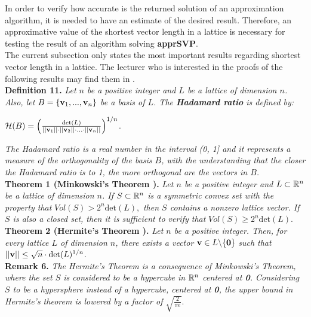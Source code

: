 In order to verify how accurate is the returned solution of an approximation algorithm, it is needed to have an estimate of the desired result. Therefore, an approximative value of the shortest vector length in a lattice is necessary for testing the result of an algorithm solving \textbf{apprSVP}. \\

The current subsection only states the most important results regarding shortest vector length in a lattice. The lecturer who is interested in the proofs of the following results may find them in \cite{HPS08}.\\

\textbf{Definition 11.} \textit{Let $n$ be a positive integer and $L$ be a lattice of dimension $n$. Also, let} $B = \{\textbf{v}_1,...,\textbf{v}_n\}$ \textit{be a basis of $L$. The \textbf{Hadamard ratio} is defined by:}
\begin{center}
	$\mathcal{H}(B) = \Big(\frac{\text{det}(L)}{||\textbf{v}_1|| \cdot ||\textbf{v}_2|| \cdot ... \cdot ||\textbf{v}_n||} \Big)^{1/n}$.
\end{center}
\textit{The Hadamard ratio is a real number in the interval (0, 1] and it represents a measure of the orthogonality of the basis $B$, with the understanding that the closer the Hadamard ratio is to 1, the more orthogonal are the vectors in $B$.}\\

\textbf{Theorem 1 (Minkowski's Theorem \cite{HPS08}).} \textit{Let $n$ be a positive integer and $L\subset \mathbb{R}^n$ be a lattice of dimension $n$. If $S \subset \mathbb{R}^n$ is a symmetric convex set with the property that} $Vol(S) > 2^n \text{det}(L),$ \textit{then $S$ contains a nonzero lattice vector. If $S$ is also a closed set, then it is sufficient to verify that }$Vol(S) \geq 2^n \text{det}(L)$. \\

\textbf{Theorem 2 (Hermite's Theorem \cite{HPS08}).} \textit{Let $n$ be a positive integer. Then, for every lattice $L$ of dimension $n$, there exists a vector} $\textbf{v} \in L \backslash\{\textbf{0}\}$ \textit{such that}  $||\textbf{v}|| \leq \sqrt{n} \cdot \text{det} (L) ^{1/n}$.\\

\textbf{Remark 6.} \textit{The Hermite's Theorem is a consequence of Minkowski's Theorem, where the set $S$ is considered to be a hypercube in $\mathbb{R}^n$ centered at \textbf{0}. Considering $S$ to be a hypersphere instead of a hypercube, centered at \textbf{0}, the upper bound in Hermite's theorem is lowered by a factor of $\sqrt{\frac{2}{\pi e}}$}.\\

